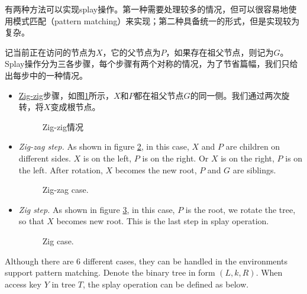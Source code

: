 \documentclass[UTF8]{article}
\begin{document}
有两种方法可以实现splay操作。第一种需要处理较多的情况，但可以很容易地使用模式匹配（pattern matching）来实现；第二种具备统一的形式，但是实现较为复杂。

记当前正在访问的节点为$X$，它的父节点为$P$，如果存在祖父节点，则记为$G$。Splay操作分为三各步骤，每个步骤有两个对称的情况，为了节省篇幅，我们只给出每步中的一种情况。

\begin{itemize}
\item \underline{Zig-zig}步骤，如图\ref{fig:zig-zig}所示，$X$和$P$都在祖父节点$G$的同一侧。我们通过两次旋转，将$X$变成根节点。

\begin{figure}[htbp]
  \centering
  \caption{Zig-zig情况} \label{fig:zig-zig}
\end{figure}

\item {\em Zig-zag step.} As shown in figure \ref{fig:zig-zag}, in this
case, $X$ and $P$ are children on different sides. $X$ is on the left,
$P$ is on the right. Or $X$ is on the right, $P$ is on the left.
After rotation, $X$ becomes the new root, $P$ and $G$ are siblings.

\begin{figure}[htbp]
  \centering
  \caption{Zig-zag case.} \label{fig:zig-zag}
\end{figure}

\item {\em Zig step.} As shown in figure \ref{fig:zig}, in this case,
$P$ is the root, we rotate the tree, so that $X$ becomes new root.
This is the last step in splay operation.

\begin{figure}[htbp]
  \centering
  \caption{Zig case.} \label{fig:zig}
\end{figure}

\end{itemize}

Although there are 6 different cases, they can be handled in the
environments support pattern matching. Denote the binary tree
in form $(L, k, R)$. When access key $Y$ in tree $T$, the splay
operation can be defined as below.
\end{document}
